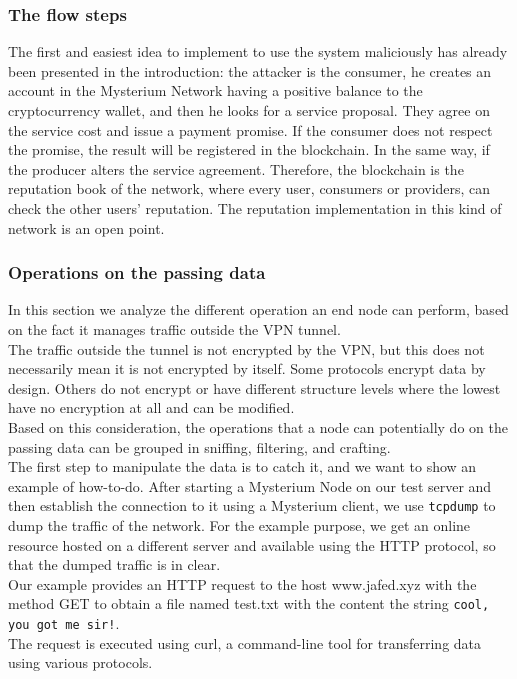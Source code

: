 \documentclass[12pt]{article}
\begin{document}
	\subsubsection{The flow steps}
	The first and easiest idea to implement to use the system maliciously has already been presented in the introduction: the attacker is the consumer, he creates an account in the Mysterium Network having a positive balance to the cryptocurrency wallet, and then he looks for a service proposal. They agree on the service cost and issue a payment promise. If the consumer does not respect the promise, the result will be registered in the blockchain. In the same way, if the producer alters the service agreement. Therefore, the blockchain is the reputation book of the network, where every user, consumers or providers, can check the other users' reputation. The reputation implementation in this kind of network is an open point.
	
	\subsubsection{Operations on the passing data}

	In this section we analyze the different operation an end node can perform, based on the fact it manages traffic outside the VPN tunnel.\\
	The traffic outside the tunnel is not encrypted by the VPN, but this does not necessarily mean it is not encrypted by itself. Some protocols encrypt data by design. Others do not encrypt or have different structure levels where the lowest have no encryption at all and can be modified.\\ Based on this consideration, the operations that a node can potentially do on the passing data can be grouped in sniffing, filtering, and crafting.\\
	The first step to manipulate the data is to catch it, and we want to show an example of how-to-do. After starting a Mysterium Node on our test server and then establish the connection to it using a Mysterium client, we use \lstinline{tcpdump} to dump the traffic of the network. For the example purpose, we get an online resource hosted on a different server and available using the HTTP protocol, so that the dumped traffic is in clear.\\
	Our example provides an HTTP request to the host www.jafed.xyz with the method GET to obtain a file named test.txt with the content the string \lstinline{cool, you got me sir!}.\\
	The request is executed using curl, a command-line tool for transferring data using various protocols.\\
\end{document}
